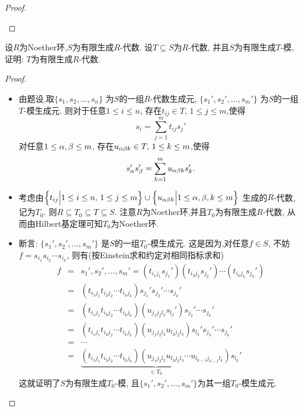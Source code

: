 \documentclass[oneside,a4papar,11pt,UTF8]{book}
\begin{document}
\begin{enumerate}
\begin{proof}
\begin{enumerate}
    \end{enumerate}
  \end{proof}

  \begin{prob}\label{ex-15-1-12}
    设$R$为Noether环,$S$为有限生成$R$-代数.
    设$T\subseteq S$为$R$-代数,
    并且$S$为有限生成$T$-模,
    证明: $T$为有限生成$R$-代数.
  \end{prob}

  \begin{proof}\,

  \begin{itemize}
    \item 由题设,取$\{s_1,s_2,...,s_n\}$
    为$S$的一组$R$-代数生成元,
    $\{s_1',s_2',...,s_m'\}$
    为$S$的一组$T$-模生成元.
    则对于任意$1\leq i\leq n$,
    存在$t_{ij}\in T,\, 1\leq j\leq m$,使得
    \[s_i=\sum_{j=1}^{m}t_{ij}s_j'\]
    对任意$1\leq\alpha,\beta\leq m$,
    存在$u_{\alpha\beta k}\in T,\,1\leq k\leq m$,使得
    \[s_{\alpha}'s_{\beta}'=\sum_{k=1}^{m}u_{\alpha\beta k}s_k'.\]

    \item 考虑由$\Big\{ t_{ij} \Big| 1\leq i\leq n,\,1\leq j\leq m \Big\}\cup
    \Big\{ u_{\alpha\beta k} \Big| 1\leq\alpha,\beta,k\leq m \Big\}$
    生成的$R$-代数,记为$T_0$.
    则$R\subseteq T_0\subseteq T\subseteq S$.
    注意$R$为Noether环,并且$T_0$为有限生成$R$-代数,
    从而由Hilbert基定理可知$T_0$为Noether环.

    \item 断言: $\{s_1',s_2',...,s_m'\}$
    是$S$的一组$T_0$-模生成元.
    这是因为,对任意$f\in S$,
    不妨$f=s_{i_1}s_{i_2}\cdots s_{i_k}$,
    则有(按Einstein求和约定对相同指标求和)
    \begin{eqnarray*}
       f
    &=&
      s_1',s_2',...,s_m'
    =
      (t_{i_1j_1}s_{j_1}')
      (t_{i_2j_2}s_{j_2}')
      \cdots
      (t_{i_kj_k}s_{j_k}')\\
    &=&
      (t_{i_1j_1}t_{i_2j_2}\cdots t_{i_kj_k})
      s_{j_1}'s_{j_2}'\cdots s_{j_k}'\\
    &=&
      (t_{i_1j_1}t_{i_2j_2}\cdots t_{i_kj_k})
      (u_{j_1j_2l_2}s_{l_2}')s_{j_2}'\cdots s_{j_k}'\\
    &=&
      (t_{i_1j_1}t_{i_2j_2}\cdots t_{i_kj_k})
      (u_{j_1j_2l_2}u_{l_2j_2l_3})s_{l_3}'s_{j_3}'\cdots s_{j_k}'\\
    &=&\cdots\\
    &=&
      \underbrace{(t_{i_1j_1}t_{i_2j_2}\cdots t_{i_kj_k})
      (u_{j_1j_2l_2}u_{l_2j_2l_3}\cdots u_{l_{k-1}j_{k-1}l_k})}_{\in T_0}
      s_{l_k}'
    \end{eqnarray*}
    这就证明了$S$为有限生成$T_0$-模,
    且$\{s_1',s_2',...,s_m'\}$为其一组$T_0$-模生成元.


\end{itemize}
\end{proof}
\end{enumerate}
\end{document}
